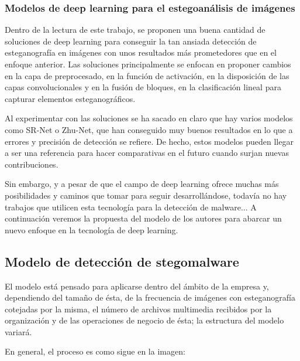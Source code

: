 \subsubsection{Modelos de deep learning para el estegoanálisis de imágenes}

Dentro de la lectura de este trabajo, se proponen una buena cantidad de soluciones de deep learning para conseguir la tan ansiada detección de esteganografía en imágenes con unos resultados más prometedores que en el enfoque anterior. Las soluciones principalmente se enfocan en proponer cambios en la capa de preprocesado, en la función de activación, en la disposición de las capas convolucionales y en la fusión de bloques, en la clasificación lineal para capturar elementos esteganográficos.

Al experimentar con las soluciones se ha sacado en claro que hay varios modelos como SR-Net o Zhu-Net, que han conseguido muy buenos resultados en lo que a errores y precisión de detección se refiere. De hecho, estos modelos pueden llegar a ser una referencia para hacer comparativas en el futuro cuando surjan nuevas contribuciones.

Sin embargo, y a pesar de que el campo de deep learning ofrece muchas más posibilidades y caminos que tomar para seguir desarrollándose, todavía no hay trabajos que utilicen esta tecnología para la detección de malware... A continuación veremos la propuesta del modelo de los autores para abarcar un nuevo enfoque en la tecnología de deep learning.

\subsection{Modelo de detección de stegomalware}

El modelo está pensado para aplicarse dentro del ámbito de la empresa y, dependiendo del tamaño de ésta, de la frecuencia de imágenes con esteganografía cotejadas por la misma, el número de archivos multimedia recibidos por la organización y de las operaciones de negocio de ésta; la estructura del modelo variará.

En general, el proceso es como sigue en la imagen:


